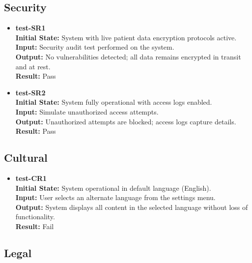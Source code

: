 \documentclass[12pt, titlepage]{article}
\begin{document}
\subsection{Security} \label{section:4.6}

\begin{itemize}
\item \textbf{test-SR1} \label{test-SR1} \\
\textbf{Initial State:} System with live patient data encryption protocols active. \\
\textbf{Input:} Security audit test performed on the system. \\
\textbf{Output:} No vulnerabilities detected; all data remains encrypted in transit and at rest. \\
\textbf{Result:} Pass \\

\item \textbf{test-SR2} \label{test-SR2} \\
\textbf{Initial State:} System fully operational with access logs enabled. \\
\textbf{Input:} Simulate unauthorized access attempts. \\
\textbf{Output:} Unauthorized attempts are blocked; access logs capture details. \\
\textbf{Result:} Pass \\
\end{itemize}

\subsection{Cultural} \label{section:4.7}

\begin{itemize}
\item \textbf{test-CR1} \label{test-CR1} \\
\textbf{Initial State:} System operational in default language (English). \\
\textbf{Input:} User selects an alternate language from the settings menu. \\
\textbf{Output:} System displays all content in the selected language without loss of functionality. \\
\textbf{Result:} Fail \\
\end{itemize}

\subsection{Legal} \label{section:4.8}
\end{document}

